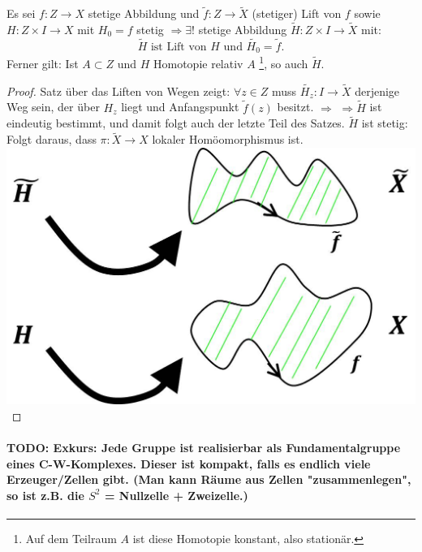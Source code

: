 \documentclass[a4paper,11pt,notitlepage]{report}
\theoremstyle{definition}
\begin{document}
\begin{theorem}
	Es sei $f \colon Z \rightarrow X$ stetige Abbildung und $\widetilde{f} \colon Z \rightarrow \widetilde{X}$ (stetiger) Lift von $f$ sowie $H \colon Z \times I \rightarrow X$ mit $H_0 = f$ stetig $\Rightarrow \exists!$ stetige Abbildung $\widetilde{H} \colon Z \times I \rightarrow \widetilde{X}$ mit:
	$$\widetilde{H} \text{ ist Lift von $H$ und $\widetilde{H_0} = \widetilde{f}$.}$$
	Ferner gilt:
	\newline
	Ist $A \subset Z$ und $H$ Homotopie relativ $A$ \footnote{Auf dem Teilraum $A$ ist diese Homotopie konstant, also stationär.}, so auch $\widetilde{H}$.
\end{theorem}

\begin{proof}
	Satz über das Liften von Wegen zeigt: \newline
	$\forall z \in Z $ muss $\widetilde{H_z} \colon I \rightarrow \widetilde{X}$ derjenige Weg sein, der über $H_z$ liegt und Anfangspunkt $\widetilde{f}(z)$ besitzt. $\Rightarrow$
	\newline
	$\Rightarrow \widetilde{H}$ ist eindeutig bestimmt, und damit folgt auch der letzte Teil des Satzes. \newline
	$\widetilde{H}$ ist stetig: Folgt daraus, dass $\pi \colon \widetilde{X} \rightarrow X$ lokaler Homöomorphismus ist. \newline
\includegraphics[scale=0.4]{images/Lift_Homotopie.jpg}
\end{proof}

\paragraph{TODO: Exkurs: Jede Gruppe ist realisierbar als Fundamentalgruppe eines C-W-Komplexes. Dieser ist kompakt, falls es endlich viele Erzeuger/Zellen gibt. (Man kann Räume aus Zellen "zusammenlegen", so ist z.B. die $S^2$ = Nullzelle + Zweizelle.)}
\end{document}
